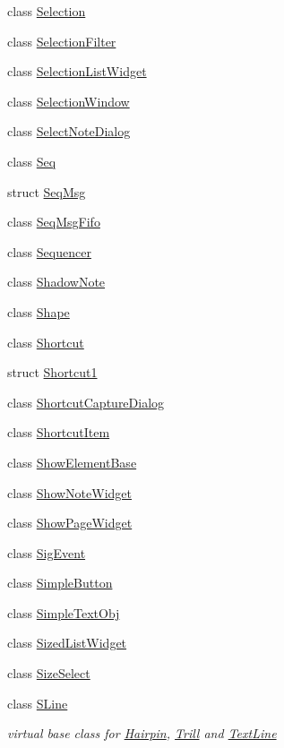 \begin{DoxyCompactItemize}
\item 
class \hyperlink{class_ms_1_1_selection}{Selection}
\item 
class \hyperlink{class_ms_1_1_selection_filter}{Selection\+Filter}
\item 
class \hyperlink{class_ms_1_1_selection_list_widget}{Selection\+List\+Widget}
\item 
class \hyperlink{class_ms_1_1_selection_window}{Selection\+Window}
\item 
class \hyperlink{class_ms_1_1_select_note_dialog}{Select\+Note\+Dialog}
\item 
class \hyperlink{class_ms_1_1_seq}{Seq}
\item 
struct \hyperlink{struct_ms_1_1_seq_msg}{Seq\+Msg}
\item 
class \hyperlink{class_ms_1_1_seq_msg_fifo}{Seq\+Msg\+Fifo}
\item 
class \hyperlink{class_ms_1_1_sequencer}{Sequencer}
\item 
class \hyperlink{class_ms_1_1_shadow_note}{Shadow\+Note}
\item 
class \hyperlink{class_ms_1_1_shape}{Shape}
\item 
class \hyperlink{class_ms_1_1_shortcut}{Shortcut}
\item 
struct \hyperlink{struct_ms_1_1_shortcut1}{Shortcut1}
\item 
class \hyperlink{class_ms_1_1_shortcut_capture_dialog}{Shortcut\+Capture\+Dialog}
\item 
class \hyperlink{class_ms_1_1_shortcut_item}{Shortcut\+Item}
\item 
class \hyperlink{class_ms_1_1_show_element_base}{Show\+Element\+Base}
\item 
class \hyperlink{class_ms_1_1_show_note_widget}{Show\+Note\+Widget}
\item 
class \hyperlink{class_ms_1_1_show_page_widget}{Show\+Page\+Widget}
\item 
class \hyperlink{class_ms_1_1_sig_event}{Sig\+Event}
\item 
class \hyperlink{class_ms_1_1_simple_button}{Simple\+Button}
\item 
class \hyperlink{class_ms_1_1_simple_text_obj}{Simple\+Text\+Obj}
\item 
class \hyperlink{class_ms_1_1_sized_list_widget}{Sized\+List\+Widget}
\item 
class \hyperlink{class_ms_1_1_size_select}{Size\+Select}
\item 
class \hyperlink{class_ms_1_1_s_line}{S\+Line}
\begin{DoxyCompactList}\small\item\em virtual base class for \hyperlink{class_ms_1_1_hairpin}{Hairpin}, \hyperlink{class_ms_1_1_trill}{Trill} and \hyperlink{class_ms_1_1_text_line}{Text\+Line} \end{DoxyCompactList}\item 

\end{DoxyCompactItemize}
